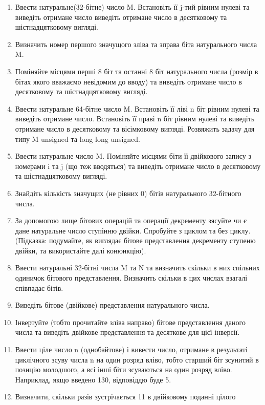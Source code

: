 \documentclass[]{article}
\begin{document}
\begin{enumerate}
\def\labelenumi{\arabic{enumi})}
\item
  Ввести натуральне(32-бітне) число M. Встановіть її j-тий рівним нулеві
  та виведіть отримане число виведіть отримане число в десятковому та
  шістнадцятковому вигляді.
\item
  Визначить номер першого значущого зліва та зправа біта натурального
  числа M.
\item
  Поміняйте місцями перші 8 біт та останні 8 біт натурального числа
  (розмір в бітах якого вважаємо невідомим до вводу) та виведіть
  отримане число в десятковому та шістнадцятковому вигляді.
\item
  Ввести натуральне 64-бітне число M. Встановіть її ліві n біт рівним
  нулеві та виведіть отримане число. Встановіть її праві n біт рівним
  нулеві та виведіть отримане число в десятковому та вісімковому
  вигляді. Розвяжить задачу для типу M unsigned та long long unsigned.
\item
  Ввести натуральне число M. Поміняйте місцями біти її двійкового запису
  з номерами i та j (що теж вводяться) та виведіть отримане число в
  десятковому та шістнадцятковому вигляді.
\item
  Знайдіть кількість значущих (не рівних 0) бітів натурального
  32-бітного числа.
\item
  За допомогою лище бітових операцій та операції декременту зясуйте чи є
  дане натуральне число ступінню двійки. Спробуйте з циклом та без
  циклу. (Підказка: подумайте, як виглядає бітове представлення
  декременту ступеню двійки, та використайте далі конюнкцію).
\item
  Ввести натуральні 32-бітні числа M та N та визначить скільки в них
  спільних одиничок бітового представлення. Визначить скільки в цих
  числах взагалі співпадає бітів.
\item
  Виведіть бітове (двійкове) представлення натурального числа.
\item
  Інвертуйте (тобто прочитайте зліва направо) бітове представлення
  даного числа та виведіть двійкове представлення та десяткове для цієї
  інверсії.
\item
  Ввести ціле число n (однобайтове) і вивести число, отримане в
  результаті циклічного зсуву числа n на один розряд вліво, тобто
  старший біт зсунитий в позицію молодшого, а всі інші біти зсуваються
  на один розряд вліво. Наприклад, якщо введено 130, відповіддю буде 5.
\item
  Визначити, скільки разів зустрічається 11 в двійковому поданні цілого

\end{enumerate}
\end{document}
